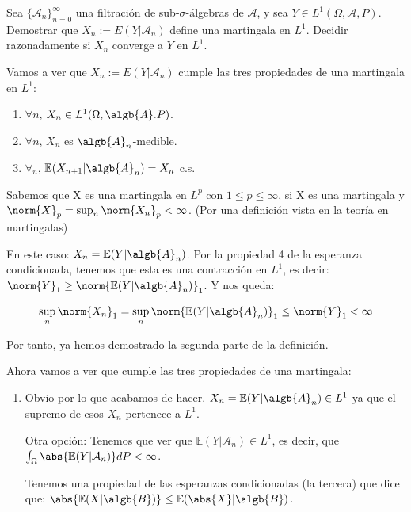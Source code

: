 \begin{problem}[1] Sea $\{\mathcal{A}_n\}_{n=0}^{\infty}$ una filtraci\'on de sub-$\sigma$-\'algebras de $\mathcal{A}$,
y sea $Y\in L^1(\Omega, \mathcal{A}, P)$. Demostrar que $X_n:=  E(Y|\mathcal{A}_n)$ define una
martingala en $L^1$. Decidir razonadamente si $X_n$ converge a $Y$ en $L^1$.

\solution

\begin{expla}
Vamos a ver que $X_n:=  E(Y|\mathcal{A}_n)$ cumple las tres propiedades de una martingala en $L^1$:
\begin{enumerate}
\item $\forall n$, $X_n \in L^1(\Omega, \algb{A}. P)$.
\item $\forall n$, $X_n$ es $\algb{A}_n$-medible.
\item $\forall_n$, $\mathbb{E}(X_{n+1}|\algb{A}_n)=X_n$ c.s.

\end{enumerate}

\end{expla}
Sabemos que X es una martingala en $L^p$ con $1\leq p \leq \infty$, si X es una martingala y $\norm{X}_p = \sup_{n}\norm{X_n}_p < \infty$. (Por una definición vista en la teoría en martingalas)

En este caso: $X_n = \mathbb{E}(Y|\algb{A}_n)$. Por la propiedad 4 de la esperanza condicionada, tenemos que esta es una contracción en $L^1$, es decir: $\norm{Y}_1 \geq \norm{\mathbb{E}(Y|\algb{A}_n)}_1$. Y nos queda:

\[
\sup_{n}\norm{X_n}_1 = \sup_{n}\norm{\mathbb{E}(Y|\algb{A}_n)}_1 \leq \norm{Y}_1 < \infty
\]

Por tanto, ya hemos demostrado la segunda parte de la definición.

Ahora vamos a ver que cumple las tres propiedades de una martingala:

\begin{enumerate}
\item Obvio por lo que acabamos de hacer. $X_n = \mathbb{E}(Y |\algb{A}_n) \in L^1$ ya que el supremo de esos $X_n$ pertenece a $L^1$.

Otra opción:
Tenemos que ver que $\mathbb{E}(Y|\mathcal{A}_n) \in L^1$, es decir, que $\int_{\Omega} \abs{\mathbb{E}(Y|\mathcal{A}_n)} dP < \infty$. 

Tenemos una propiedad de las esperanzas condicionadas (la tercera) que dice que: $\abs{\mathbb{E}(X|\algb{B})} \leq \mathbb{E}(\abs{X}|\algb{B})$.


\end{enumerate}
\end{problem}
